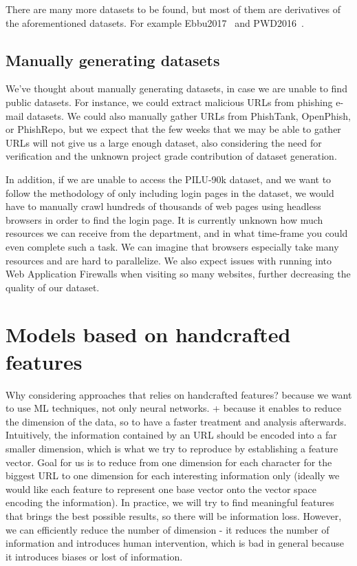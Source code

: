 \documentclass{article}
\begin{document}
    There are many more datasets to be found, but most of them are derivatives of the aforementioned datasets.
    For example Ebbu2017~\cite{EBBU2017} and PWD2016~\cite{PWD2016}.

    \subsection{Manually generating datasets}\label{subsec:manually-generating-datasets}

    We've thought about manually generating datasets, in case we are unable to find public datasets.
    For instance, we could extract malicious URLs from phishing e-mail datasets.
    We could also manually gather URLs from PhishTank, OpenPhish, or PhishRepo, but we expect that the few weeks that we may be able to gather URLs will not give us a large enough dataset, also considering the need for verification and the unknown project grade contribution of dataset generation.

    In addition, if we are unable to access the PILU-90k dataset, and we want to follow the methodology of only including login pages in the dataset, we would have to manually crawl hundreds of thousands of web pages using headless browsers in order to find the login page.
    It is currently unknown how much resources we can receive from the department, and in what time-frame you could even complete such a task.
    We can imagine that browsers especially take many resources and are hard to parallelize.
    We also expect issues with running into Web Application Firewalls when visiting so many websites, further decreasing the quality of our dataset.


    \section{Models based on handcrafted features}\label{sec:models-based-on-handcrafted-features}

    Why considering approaches that relies on handcrafted features?
    because we want to use ML techniques, not only neural networks.
    + because it enables to reduce the dimension of the data, so to have a faster treatment and analysis afterwards.
    Intuitively, the information contained by an URL should be encoded into a far smaller dimension, which is what we try to reproduce by establishing a feature vector.
    Goal for us is to reduce from one dimension for each character for the biggest URL to one dimension for each interesting information only (ideally we would like each feature to represent one base vector onto the vector space encoding the information).
    In practice, we will try to find meaningful features that brings the best possible results, so there will be information loss.
    However, we can efficiently reduce the number of dimension
    - it reduces the number of information and introduces human intervention, which is bad in general because it introduces biases or lost of information.
\end{document}
